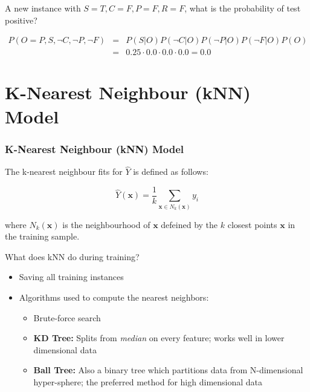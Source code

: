 \documentclass[aspectratio=169, 10pt]{beamer}
\newcommand{\vect}{\mathbf}
\begin{document}
\begin{frame}[t]
    A new instance with $S=T, C=F, P=F, R=F$, what is the probability of test positive?

    \begin{equation*}
        \begin{array} {rcl}
            P(O=P,S, \neg C, \neg P , \neg F) & = & P(S|O)P(\neg C|O)P(\neg P |O)P(\neg F |O)P(O) \\
            & = & 0.25 \cdot 0.0 \cdot 0.0 \cdot 0.0 = 0.0
        \end{array}
    \end{equation*}

\end{frame}

\section{K-Nearest Neighbour (kNN) Model}
\begin{frame}[t]
    \frametitle{K-Nearest Neighbour (kNN) Model}

    The k-nearest neighbour fits for $\hat{Y}$ is defined as follows:

    \begin{equation*}
        \hat{Y}(\vect{x}) = \frac{1}{k} \sum_{\vect{x} \in N_k (\vect{x})} y_i
    \end{equation*}

    where $N_k (\vect{x})$ is the neighbourhood of $\vect{x}$ defeined by the $k$ closest 
    points $\vect{x}$ in the training sample.

    \vspace{1em}
    What does kNN do during training?
    \pause
    \begin{itemize}
        \item Saving all training instances
        \item Algorithms used to compute the nearest neighbors:
            \begin{itemize}
                \item Brute-force search
                \item \textbf{KD Tree:} Splits from \textit{median} on every feature; works well in lower dimensional data
                \item \textbf{Ball Tree:} Also a binary tree which partitions data from N-dimensional hyper-sphere; the preferred method for high dimensional data
            \end{itemize}
    \end{itemize}

\end{frame}
\end{document}
